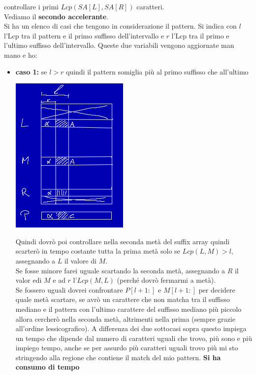 \documentclass[a4paper,12pt, oneside]{book}
\begin{document}
controllare i primi $Lcp(SA[L], SA[R])$ caratteri.
\\ Vediamo il \textbf{secondo accelerante}.\\
Si ha un elenco di casi che tengono in considerazione il pattern. Si
indica con $l$ l'Lcp tra il pattern e il primo suffisso
dell'intervallo e $r$ l'Lcp tra il primo e l'ultimo suffisso
dell'intervallo. Queste due variabili vengono aggiornate man mano e ho:
\begin{itemize}
  \item \textbf{caso 1:} se $l>r$ quindi il pattern somiglia più al
  primo suffisso che all'ultimo
  \begin{center}
    \includegraphics[scale = 0.5]{img/arr2.png}
  \end{center}
  Quindi dovrò poi controllare nella seconda metà del suffix array
  quindi scarterò in tempo costante tutta la prima metà solo se
  $Lcp(L,M)>l$, assegnando a $L$ il valore di $M$.\\
  Se fosse minore farei uguale scartando la seconda metà, assegnando a $R$
  il valor edi $M$ e ad $r$ l'$Lcp(M,L)$ (perché dovrò fermarmi a metà).\\
  Se fossero uguali dovrei confrontare $P[l+1:]$ e $M[l+1:]$ per
  decidere quale metà scartare, se avrò un carattere che non matcha
  tra il suffisso mediano e il pattern con l'ultimo carattere del
  suffisso mediano più piccolo allora cercherò nella seconda metà,
  altrimenti nella prima (sempre grazie all'ordine lessicografico).
  A differenza dei due sottocasi sopra questo
  impiega un tempo che dipende dal numero di caratteri uguali che
  trovo, più sono e più impiego tempo, anche se per assurdo più
  caratteri uguali trovo più mi sto stringendo alla regione che
  contiene il match del mio pattern. \textbf{Si ha consumo di tempo
}
\end{itemize}
\end{document}
